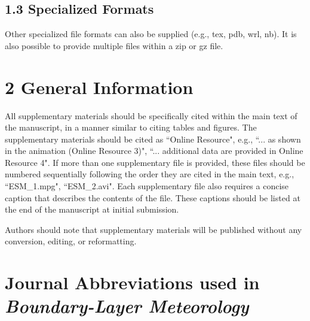 \subsection*{1.3 Specialized Formats}
Other specialized file formats can also be supplied (e.g., tex, pdb, wrl, nb). It is also possible to provide multiple files within a zip or gz file.

\section*{2 General Information}
All supplementary materials should be specifically cited within the main text of the manuscript, in a manner similar to citing tables and figures. The supplementary materials should be cited as ``Online Resource", e.g., ``... as shown in the animation (Online Resource 3)", ``... additional data are provided in Online Resource 4". If more than one supplementary file is provided, these files should be numbered sequentially following the order they are cited in the main text, e.g., ``ESM\_1.mpg", ``ESM\_2.avi". Each supplementary file also requires a concise caption that describes the contents of the file. These captions should be listed at the end of the manuscript at initial submission.

Authors should note that supplementary materials will be published without any conversion, editing, or reformatting.
\clearpage

\section*{Journal Abbreviations used in \textit{Boundary-Layer Meteorology}}


